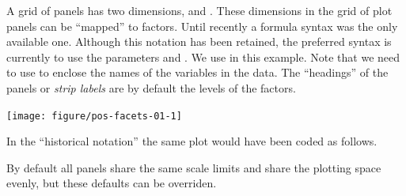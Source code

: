\documentclass[krantz2]{krantz}\usepackage{knitr}%
\begin{document}
A grid of panels has two dimensions,  and . These dimensions in the grid of plot panels can be ``mapped'' to factors. Until recently a formula syntax was the only available one. Although this notation has been retained, the preferred syntax is currently to use the parameters  and . We use  in this example. Note that we need to use  to enclose the names of the variables in the data. The ``headings'' of the panels or \emph{strip labels} are by default the levels of the factors.

\begin{knitrout}\footnotesize
{}\color{fgcolor}\begin{kframe}
\begin{alltt}
 \hlopt{+} \hlstd{(} \hlstd{=} 
\end{alltt}
\end{kframe}

{\centering \texttt{[image: figure/pos-facets-01-1]} 

}



\end{knitrout}

In the ``historical notation'' the same plot would have been coded as follows.

\begin{knitrout}\footnotesize
{}\color{fgcolor}\begin{kframe}
\begin{alltt}
 \hlopt{+}  \hlopt{~} 
\end{alltt}
\end{kframe}
\end{knitrout}

By default all panels share the same scale limits and share the plotting space evenly, but these defaults can be overriden.

\begin{knitrout}\footnotesize
{}\color{fgcolor}\begin{kframe}
\begin{alltt}
 \hlopt{+} \hlstd{(} \hlstd{=}   \hlstd{=} \hlstd{)}
 \hlopt{+} \hlstd{(} \hlstd{=}   \hlstd{=} \hlstd{,}  \hlstd{=} \hlstd{)}
\end{alltt}
\end{kframe}
\end{knitrout}
\end{document}
